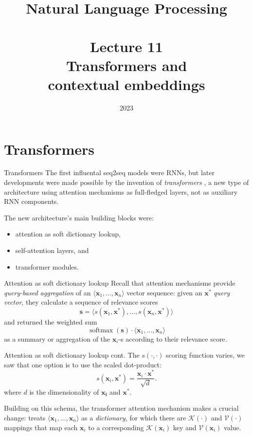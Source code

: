 \documentclass[style=upen, size=14pt]{powerdot}
\DeclareMathOperator*{\softmax}{softmax}
\newcommand{\gold}{\color{arany}}
\theoremstyle{definition}
\begin{document}
\title{Natural Language Processing\\~~\\Lecture 11\\Transformers and\\
  contextual embeddings}

\date{2023}
\maketitle

\section[toc=Transformers]{Transformers}

\begin{slide}[toc=Introduction]{Transformers}
  The first influental seq2seq models were RNNs, but later developments were
  made possible by the invention of \emph{\gold transformers}
  \citep{vaswani2017attention}, a new type of architecture using attention
  mechanisms as full-fledged layers, not as auxiliary RNN components.\bigskip

  The new architecture's main building blocks were:
  \begin{itemize}
  \item attention as soft dictionary lookup,
  \item self-attention layers, and
  \item transformer modules.
  \end{itemize}
\end{slide}

\begin{slide}[toc=KV-attention]{Attention as soft dictionary lookup}
  Recall that attention mechanisms provide \emph{query-based aggregation} of an
  $\langle \mathbf{x}_1,\dots, \mathbf{x}_n\rangle $ vector sequence: given an
  $\mathbf{x^*}$ \emph{query vector}, they calculate a sequence of relevance
  scores
  $$
  \mathbf{s} = \langle s(\mathbf{x}_1, \mathbf{x}^*),\dots, s(\mathbf{x}_n,
  \mathbf{x}^*) \rangle
  $$
  and returned the weighted sum 
  $$
  \softmax (\mathbf{s})\cdot \langle \mathbf{x}_1,\dots, \mathbf{x}_n\rangle 
  $$
  as a summary or aggregation of the $\mathbf{x}_i$-s according to their
  relevance score.
\end{slide}

\begin{slide}[toc=]{Attention as soft dictionary lookup cont.}
  The $s(\cdot, \cdot)$ scoring function varies, we saw that one option is to
  use the scaled dot-product:
  $$
  s(\mathbf{x}_i, \mathbf{x}^*) = \frac{\mathbf{x}_i\cdot
    \mathbf{x}^*}{\sqrt{d}}.
  $$
  where $d$ is the dimensionality of $\mathbf{x_i}$ and $\mathbf{x^*}$.\bigskip

  Building on this schema, the transformer attention mechanism makes a crucial
  change: treats $\langle \mathbf{x}_1,\dots, \mathbf{x}_n\rangle$ as a
  \emph{\gold dictionary}, for which there are $\mathcal K(\cdot)$ and $\mathcal V(\cdot)$
  mappings that map each $\mathbf{x}_i$ to a corresponding
  $\mathcal K(\mathbf{x}_i)$ key and $\mathcal V(\mathbf{x}_i)$ value.
\end{slide}
\end{document}
